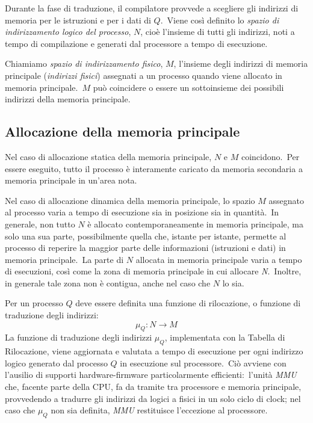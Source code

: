 Durante la fase di traduzione, il compilatore provvede a scegliere gli indirizzi di memoria per le istruzioni e per i dati di $Q$.\
Viene così definito lo \textit{spazio di indirizzamento logico del processo}, $N$, cioè l'insieme di tutti gli indirizzi, noti a tempo di compilazione e generati dal processore a tempo di esecuzione.

Chiamiamo \textit{spazio di indirizzamento fisico}, $M$, l'insieme degli indirizzi di memoria principale (\textit{indirizzi fisici}) assegnati a un processo quando viene allocato in memoria principale.\
$M$ può coincidere o essere un sottoinsieme dei possibili indirizzi della memoria principale.

\subsection{Allocazione della memoria principale}

Nel caso di allocazione statica della memoria principale, $N$ e $M$ coincidono.\
Per essere eseguito, tutto il processo è interamente caricato da memoria secondaria a memoria principale in un'area nota.

Nel caso di allocazione dinamica della memoria principale, lo spazio $M$ assegnato al processo varia a tempo di esecuzione sia in posizione sia in quantità.\
In generale, non tutto $N$ è allocato contemporaneamente in memoria principale, ma solo una sua parte, possibilmente quella che, istante per istante, permette al processo di reperire la maggior parte delle informazioni (istruzioni e dati) in memoria principale.\
La parte di $N$ allocata in memoria principale varia a tempo di esecuzioni, così come la zona di memoria principale in cui allocare \textit{N}.\
Inoltre, in generale tale zona non è contigua, anche nel caso che $N$ lo sia.

Per un processo $Q$ deve essere definita una funzione di rilocazione, o funzione di traduzione degli indirizzi:
\[\mu_Q: N \rightarrow M\]
La funzione di traduzione degli indirizzi $\mu_Q$, implementata con la Tabella di Rilocazione, viene aggiornata e valutata a tempo di esecuzione per ogni indirizzo logico generato dal processo $Q$ in esecuzione sul processore.\
Ciò avviene con l'ausilio di supporti hardware-firmware particolarmente efficienti:\ l'unità \textit{MMU} che, facente parte della CPU, fa da tramite tra processore e memoria principale, provvedendo a tradurre gli indirizzi da logici a fisici in un solo ciclo di clock; nel caso che $\mu_Q$ non sia definita, \textit{MMU} restituisce l'eccezione al processore.

